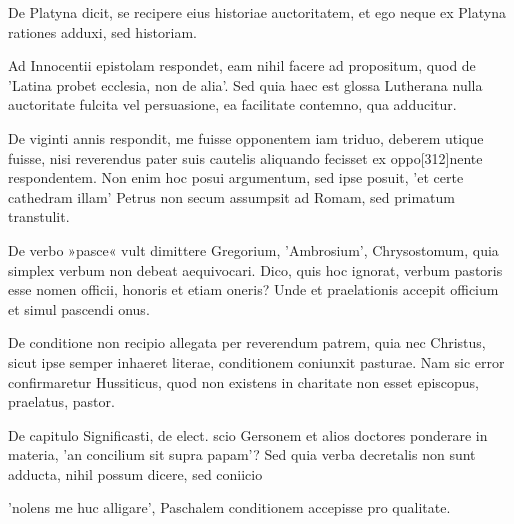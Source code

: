 De Platyna dicit, se recipere eius historiae auctoritatem, et ego neque ex Platyna rationes adduxi, sed historiam.

Ad Innocentii epistolam respondet, eam nihil facere ad propositum, quod de 'Latina probet ecclesia, non de alia'. Sed quia haec est glossa Lutherana nulla auctoritate fulcita vel persuasione, ea facilitate contemno, qua adducitur.

De viginti annis respondit, me fuisse opponentem iam triduo, deberem utique fuisse, nisi reverendus pater suis cautelis aliquando fecisset ex oppo[312]nente respondentem. Non enim hoc posui argumentum, sed ipse posuit, 'et certe cathedram illam' Petrus non secum assumpsit ad Romam, sed primatum transtulit.

De verbo »pasce« vult dimittere Gregorium, 'Ambrosium', Chrysostomum, quia simplex verbum non debeat aequivocari. Dico, quis hoc ignorat, verbum pastoris esse nomen officii, honoris et etiam oneris? Unde et praelationis accepit officium et simul pascendi onus.

De conditione non recipio allegata per reverendum patrem, quia nec Christus, sicut ipse semper inhaeret literae, conditionem coniunxit pasturae. Nam sic error confirmaretur Hussiticus, quod non existens in charitate non esset episcopus, praelatus, pastor.

De capitulo Significasti, de elect. scio Gersonem et alios doctores ponderare in materia, 'an concilium sit supra papam'? Sed quia verba decretalis non sunt adducta, nihil possum dicere, sed coniicio

'nolens me huc alligare', Paschalem conditionem accepisse pro qualitate.

